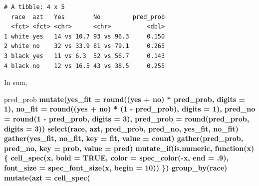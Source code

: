 \documentclass[]{book}
\newenvironment{Shaded}{\begin{snugshade}}{\end{snugshade}}
\newcommand{\ControlFlowTok}[1]{\textcolor[rgb]{0.13,0.29,0.53}{\textbf{#1}}}
\newcommand{\DataTypeTok}[1]{\textcolor[rgb]{0.13,0.29,0.53}{#1}}
\newcommand{\DecValTok}[1]{\textcolor[rgb]{0.00,0.00,0.81}{#1}}
\newcommand{\FloatTok}[1]{\textcolor[rgb]{0.00,0.00,0.81}{#1}}
\newcommand{\KeywordTok}[1]{\textcolor[rgb]{0.13,0.29,0.53}{\textbf{#1}}}
\newcommand{\NormalTok}[1]{#1}
\newcommand{\OperatorTok}[1]{\textcolor[rgb]{0.81,0.36,0.00}{\textbf{#1}}}
\newcommand{\OtherTok}[1]{\textcolor[rgb]{0.56,0.35,0.01}{#1}}
\newcommand{\StringTok}[1]{\textcolor[rgb]{0.31,0.60,0.02}{#1}}
\begin{document}
\begin{verbatim}
# A tibble: 4 x 5
  race  azt   Yes        No         pred_prob
  <fct> <fct> <chr>      <chr>          <dbl>
1 white yes   14 vs 10.7 93 vs 96.3     0.150
2 white no    32 vs 33.9 81 vs 79.1     0.265
3 black yes   11 vs 6.3  52 vs 56.7     0.143
4 black no    12 vs 16.5 43 vs 38.5     0.255
\end{verbatim}

In sum,

\begin{Shaded}
\begin{Highlighting}[]
\NormalTok{pred_prob }\OperatorTok{%
\StringTok{  }\KeywordTok{mutate}\NormalTok{(}\DataTypeTok{yes_fit =} \KeywordTok{round}\NormalTok{((yes }\OperatorTok{+}\StringTok{ }\NormalTok{no) }\OperatorTok{*}\StringTok{ }\NormalTok{pred_prob, }\DataTypeTok{digits =} \DecValTok{1}\NormalTok{),}
         \DataTypeTok{no_fit =} \KeywordTok{round}\NormalTok{((yes }\OperatorTok{+}\StringTok{ }\NormalTok{no) }\OperatorTok{*}\StringTok{ }\NormalTok{(}\DecValTok{1} \OperatorTok{-}\StringTok{ }\NormalTok{pred_prob), }\DataTypeTok{digits =} \DecValTok{1}\NormalTok{),}
         \DataTypeTok{pred_no =} \KeywordTok{round}\NormalTok{(}\DecValTok{1} \OperatorTok{-}\StringTok{ }\NormalTok{pred_prob, }\DataTypeTok{digits =} \DecValTok{3}\NormalTok{),}
         \DataTypeTok{pred_prob =} \KeywordTok{round}\NormalTok{(pred_prob, }\DataTypeTok{digits =} \DecValTok{3}\NormalTok{)) }\OperatorTok{%
\StringTok{  }\KeywordTok{select}\NormalTok{(race, azt, pred_prob, pred_no, yes_fit, no_fit) }\OperatorTok{%
\StringTok{  }\KeywordTok{gather}\NormalTok{(yes_fit, no_fit, }\DataTypeTok{key =}\NormalTok{ fit, }\DataTypeTok{value =}\NormalTok{ count) }\OperatorTok{%
\StringTok{  }\KeywordTok{gather}\NormalTok{(pred_prob, pred_no, }\DataTypeTok{key =}\NormalTok{ prob, }\DataTypeTok{value =}\NormalTok{ pred) }\OperatorTok{%
\StringTok{  }\KeywordTok{mutate_if}\NormalTok{(is.numeric, }\ControlFlowTok{function}\NormalTok{(x) \{}
    \KeywordTok{cell_spec}\NormalTok{(x, }\DataTypeTok{bold =} \OtherTok{TRUE}\NormalTok{,}
              \DataTypeTok{color =} \KeywordTok{spec_color}\NormalTok{(}\OperatorTok{-}\NormalTok{x, }\DataTypeTok{end =} \FloatTok{.9}\NormalTok{),}
              \DataTypeTok{font_size =} \KeywordTok{spec_font_size}\NormalTok{(x, }\DataTypeTok{begin =} \DecValTok{10}\NormalTok{))}
\NormalTok{  \}) }\OperatorTok{%
\StringTok{  }\KeywordTok{group_by}\NormalTok{(race) }\OperatorTok{%
\StringTok{  }\KeywordTok{mutate}\NormalTok{(}\DataTypeTok{azt =} \KeywordTok{cell_spec}\NormalTok{(}
}}}}}}}
\end{Highlighting}
\end{Shaded}
\end{document}
